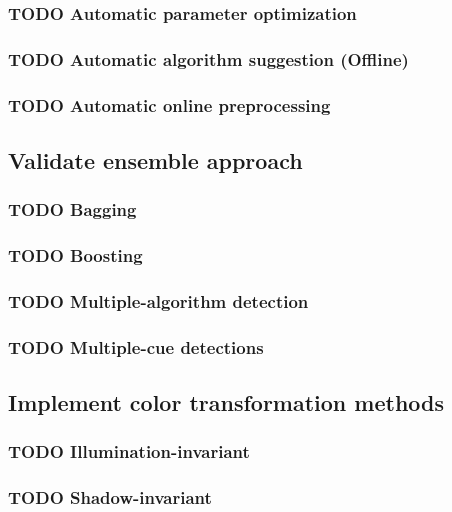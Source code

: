 \documentclass[11pt]{article}
\begin{document}
\subsubsection{{\bfseries\sffamily TODO} Automatic parameter optimization}
\label{sec:orgd9493c3}
\subsubsection{{\bfseries\sffamily TODO} Automatic algorithm suggestion (Offline)}
\label{sec:orgc074c48}
\subsubsection{{\bfseries\sffamily TODO} Automatic online preprocessing}
\label{sec:orga7ccaef}
\subsection{Validate ensemble approach}
\label{sec:org1a354b8}
\subsubsection{{\bfseries\sffamily TODO} Bagging}
\label{sec:orgd895ac3}
\subsubsection{{\bfseries\sffamily TODO} Boosting}
\label{sec:org544550b}
\subsubsection{{\bfseries\sffamily TODO} Multiple-algorithm detection}
\label{sec:org6dcec2e}
\subsubsection{{\bfseries\sffamily TODO} Multiple-cue detections}
\label{sec:org5003475}
\subsection{Implement color transformation methods}
\label{sec:org053d095}
\subsubsection{{\bfseries\sffamily TODO} Illumination-invariant}
\label{sec:org6c1c03a}
\subsubsection{{\bfseries\sffamily TODO} Shadow-invariant}
\label{sec:orgb883ba3}
\end{document}
